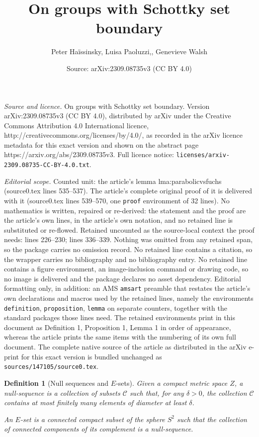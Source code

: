 \documentclass[10pt,a4paper]{amsart}
\title{On groups with Schottky set boundary}
\author{Peter Ha\"issinsky, Luisa Paoluzzi,, Genevieve Walsh}
\date{Source: arXiv:2309.08735v3 (CC BY 4.0)}
\newtheorem{definition}{Definition}
\begin{document}
\maketitle

\noindent\emph{Source and licence.} On groups with Schottky set boundary. Version arXiv:2309.08735v3 (CC BY 4.0), distributed by arXiv under the Creative Commons Attribution 4.0 International licence, http://creativecommons.org/licenses/by/4.0/, as recorded in the arXiv licence metadata for this exact version and shown on the abstract page https://arxiv.org/abs/2309.08735v3. Full licence notice: \texttt{licenses/arxiv-2309.08735-CC-BY-4.0.txt}.\par\smallskip

\noindent\textit{Editorial scope.} Counted unit: the article's lemma lma:parabolicvsfuchs (source0.tex lines 535--537). The article's complete original proof of it is delivered with it (source0.tex lines 539--570, one \texttt{proof} environment of 32 lines). No mathematics is written, repaired or re-derived: the statement and the proof are the article's own lines, in the article's own notation, and no retained line is substituted or re-flowed.  Retained uncounted as the source-local context the proof needs: lines 226--230; lines 336--339.  Nothing was omitted from any retained span, so the package carries no omission record.  No retained line contains a citation, so the wrapper carries no bibliography and no bibliography entry.  No retained line contains a figure environment, an image-inclusion command or drawing code, so no image is delivered and the package declares no asset dependency.  Editorial formatting only, in addition: an AMS \texttt{amsart} preamble that restates the article's own declarations and macros used by the retained lines, namely the environments \texttt{definition}, \texttt{proposition}, \texttt{lemma} on separate counters, together with the standard packages those lines need.  The retained environments print in this document as Definition 1, Proposition 1, Lemma 1 in order of appearance, whereas the article prints the same items with the numbering of its own full document.  The complete native source of the article as distributed in the arXiv e-print for this exact version is bundled unchanged as \texttt{sources/147105/source0.tex}.
\begin{definition}[Null sequences and $E$-sets]\label{def:nses}
Given a compact metric space $Z$, a \emph{null-sequence} is a collection of subsets $\mathcal{C}$ such that, for any $\delta >0$, the collection $\mathcal{C}$ contains at most finitely many elements of diameter at least $\delta$.

An \emph{$E$-set} is a connected compact subset of the sphere $S^2$ such that the collection of connected components of its complement is a null-sequence.
\end{definition}
\end{document}
